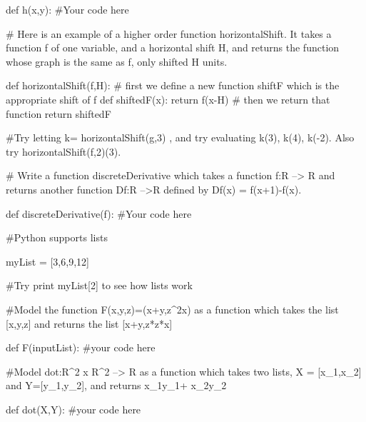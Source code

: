 def h(x,y):
	#Your code here
	
# Here is an example of a higher order function horizontalShift.  It takes a function f of one variable, and a horizontal shift H, and returns the function whose graph is the same as f, only shifted H units.

def horizontalShift(f,H):
	# first we define a new function shiftF which is the appropriate shift of f
	def shiftedF(x):  
		return f(x-H) 
	# then we return that function
	return shiftedF

#Try  letting  k= horizontalShift(g,3) 	, and try evaluating k(3), k(4), k(-2).  Also try horizontalShift(f,2)(3).

# Write a function discreteDerivative which takes a function f:R --> R and returns another function Df:R -->R defined by Df(x) = f(x+1)-f(x).

def discreteDerivative(f):
	#Your code here
	
#Python supports lists

	myList = [3,6,9,12]

#Try print myList[2] to see how lists work

#Model the function F(x,y,z)=(x+y,z^2x) as a function which takes the list [x,y,z] and returns the list [x+y,z*z*x]

def F(inputList):
	#your code here
	
#Model dot:R^2 x R^2 --> R as a function which takes two lists, X = [x_1,x_2] and Y=[y_1,y_2], and returns x_1y_1+ x_2y_2

def dot(X,Y):
	#your code here
	




